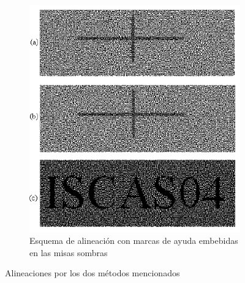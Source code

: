 \begin{figure}[ht]
\begin{subfigure}[t]{0.4\textwidth}
		\includegraphics[width=\textwidth]{images/alin2}
		\caption{Esquema de alineación con marcas de ayuda embebidas en
		las misas sombras}
		\label{fig:alin2}
	\end{subfigure}
	\caption{Alineaciones por los dos métodos mencionados}
	\label{fig:alineacion}
\end{figure}

